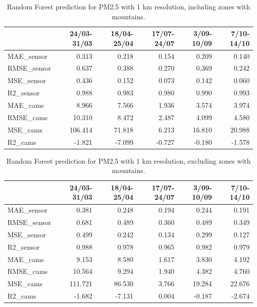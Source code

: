 \begin{table}[H]
\begin{tabular}{lrrrrr}
\toprule
  &  24/03-31/03 &  18/04-25/04 &  17/07-24/07 &  3/09-10/09 &  7/10-14/10 \\
\midrule
 MAE\_sensor &        0.313 &        0.218 &        0.154 &       0.209 &       0.140 \\
RMSE\_sensor &        0.637 &        0.388 &        0.270 &       0.369 &       0.242 \\
 MSE\_sensor &        0.436 &        0.152 &        0.073 &       0.142 &       0.060 \\
  R2\_sensor &        0.988 &        0.983 &        0.980 &       0.990 &       0.993 \\
   MAE\_cams &        8.966 &        7.566 &        1.936 &       3.574 &       3.974 \\
  RMSE\_cams &       10.310 &        8.472 &        2.487 &       4.099 &       4.580 \\
   MSE\_cams &      106.414 &       71.818 &        6.213 &      16.810 &      20.988 \\
    R2\_cams &       -1.821 &       -7.099 &       -0.727 &      -0.180 &      -1.578 \\
\bottomrule
\end{tabular}

\caption{Random Forest prediction for PM2.5 with 1 km resolution, including zones with mountains.}
\end{table}


\begin{table}[H]
\begin{tabular}{lrrrrr}
\toprule
  &  24/03-31/03 &  18/04-25/04 &  17/07-24/07 &  3/09-10/09 &  7/10-14/10 \\
\midrule
 MAE\_sensor &        0.381 &        0.248 &        0.194 &       0.244 &       0.191 \\
RMSE\_sensor &        0.681 &        0.489 &        0.360 &       0.489 &       0.349 \\
 MSE\_sensor &        0.499 &        0.242 &        0.134 &       0.299 &       0.127 \\
  R2\_sensor &        0.988 &        0.978 &        0.965 &       0.982 &       0.979 \\
   MAE\_cams &        9.153 &        8.580 &        1.617 &       3.830 &       4.192 \\
  RMSE\_cams &       10.564 &        9.294 &        1.940 &       4.382 &       4.760 \\
   MSE\_cams &      111.721 &       86.530 &        3.766 &      19.284 &      22.676 \\
    R2\_cams &       -1.682 &       -7.131 &        0.004 &      -0.187 &      -2.674 \\
\bottomrule
\end{tabular}

\caption{Random Forest prediction for PM2.5 with 1 km resolution, excluding zones with mountains.}
\end{table}


